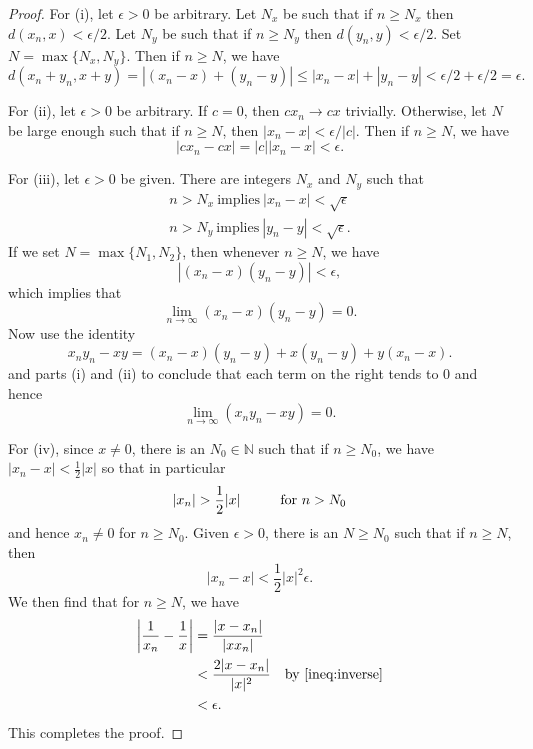 \documentclass[12pt]{article}
\theoremstyle{definition}
\theoremstyle{theorem}
\begin{document}
\begin{proof}
For (i), let $\epsilon > 0$ be arbitrary. Let $N_x$ be such that if $n \geqslant N_x$ then $d(x_n, x) < \epsilon/2$. Let $N_y$ be such that if $n \geqslant N_y$ then $d(y_n, y) < \epsilon/2$. Set $N = \max\{N_x, N_y\}$. Then if $n \geqslant N$, we have 
\[
d(x_n + y_n, x + y) = |(x_n - x) + (y_n - y)| \leqslant |{x_n - x}| + |{y_n - y}| < \epsilon/2 + \epsilon/2 = \epsilon.
\]

For (ii), let $\epsilon > 0$ be arbitrary. If $c = 0$, then $cx_n \to cx$ trivially. Otherwise, let $N$ be large enough such that if $n \geqslant N$, then $|{x_n - x}| < \epsilon/|c|$. Then if $n \geqslant N$, we have 
\[
|{cx_n - cx}| = |c| |{x_n - x}| < \epsilon.
\]

For (iii), let $\epsilon > 0$ be given. There are integers $N_x$ and $N_y$ such that 
\begin{align*}
n > N_x \: \text{implies} \: |x_n - x| < \sqrt{\epsilon} \\
n > N_y \: \text{implies} \: |y_n - y| < \sqrt{\epsilon}.
\end{align*}
If we set $N = \max\{N_1, N_2\}$, then whenever $n \geqslant N$, we have 
\[
|(x_n - x)(y_n - y)| < \epsilon,
\] 
which implies that 
\[
\lim_{n \to \infty} (x_n - x)(y_n - y) = 0.
\]
Now use the identity 
\[
x_ny_n - xy = (x_n - x)(y_n - y) + x(y_n - y) + y(x_n - x).
\]
and parts (i) and (ii) to conclude that each term on the right tends to $0$ and hence 
\[
\lim_{n \to \infty}(x_ny_n - xy) = 0.
\]


For (iv), since $x \ne 0$,  there is an $N_0 \in \mathbb{N}$ such that if $n \geqslant N_0$, we have $|x_n - x| < \frac{1}{2}|x|$ so that in particular
\begin{align}\label{ineq:inverse}
|x_n| > \frac{1}{2}|x| \hspace{10mm} \text{for $n > N_0$}
\end{align}
and hence $x_n \ne 0$ for $n \geqslant N_0$.  Given $\epsilon > 0$, there is an $N \geqslant N_0$ such that if $n \geqslant N$, then 
\[
|x_n - x| < \frac{1}{2}|x|^2 \epsilon.
\]
We then find that for $n \geqslant N$, we have 
\begin{align*}
\left|\frac{1}{x_n} - \frac{1}{x}\right| &= \frac{|x - x_n|}{|xx_n|} \\
&< \frac{2|x - x_n|}{|x|^2} &\text{by \eqref{ineq:inverse}} \\
&< \epsilon.
\end{align*}
This completes the proof. 
\end{proof}
\end{document}
